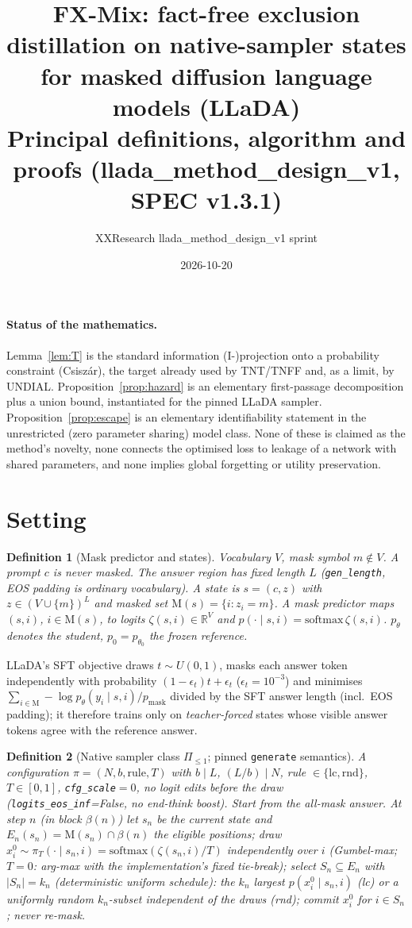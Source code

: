 \documentclass[11pt]{article}
\title{FX-Mix: fact-free exclusion distillation on native-sampler states\\for masked diffusion language models (LLaDA)\\[4pt]\large Principal definitions, algorithm and proofs (llada\_method\_design\_v1, SPEC v1.3.1)}
\author{XXResearch llada\_method\_design\_v1 sprint}
\date{2026-10-20}
\newtheorem{definition}{Definition}
\newcommand{\M}{\mathrm{M}}
\begin{document}
\maketitle

\paragraph{Status of the mathematics.} Lemma~\ref{lem:T} is the standard information (I-)projection onto a
probability constraint (Csisz\'ar), the target already used by TNT/TNFF and, as a limit, by UNDIAL. Proposition~\ref{prop:hazard}
is an elementary first-passage decomposition plus a union bound, instantiated for the pinned LLaDA sampler.
Proposition~\ref{prop:escape} is an elementary identifiability statement in the unrestricted (zero parameter sharing)
model class. None of these is claimed as the method's novelty, none connects the optimised loss to leakage of a
network with shared parameters, and none implies global forgetting or utility preservation.

\section{Setting}
\begin{definition}[Mask predictor and states]
Vocabulary $V$, mask symbol $m\notin V$. A prompt $c$ is never masked. The answer region has fixed length $L$
(\texttt{gen\_length}, EOS padding is ordinary vocabulary). A \emph{state} is $s=(c,z)$ with $z\in(V\cup\{m\})^L$ and
masked set $\M(s)=\{i: z_i=m\}$. A mask predictor maps $(s,i)$, $i\in\M(s)$, to logits $\zeta(s,i)\in\mathbb{R}^{V}$ and
$p(\cdot\mid s,i)=\mathrm{softmax}\,\zeta(s,i)$. $p_\theta$ denotes the student, $p_0=p_{\theta_0}$ the frozen reference.
\end{definition}
LLaDA's SFT objective draws $t\sim U(0,1)$, masks each answer token independently with probability $(1-\epsilon_t)t+\epsilon_t$
($\epsilon_t=10^{-3}$) and minimises $\sum_{i\in\M}\!-\log p_\theta(y_i\mid s,i)/p_{\text{mask}}$ divided by the SFT answer length (incl.\ EOS padding); it
therefore trains only on \emph{teacher-forced} states whose visible answer tokens agree with the reference answer.

\begin{definition}[Native sampler class $\Pi_{\le 1}$; pinned \texttt{generate} semantics]\label{def:sampler}
A configuration $\pi=(N,b,\text{rule},T)$ with $b\mid L$, $(L/b)\mid N$, rule $\in\{\mathrm{lc},\mathrm{rnd}\}$,
$T\in[0,1]$, \texttt{cfg\_scale}$=0$, no logit edits before the draw (\texttt{logits\_eos\_inf}=False, no end-think boost).
Start from the all-mask answer. At step $n$ (in block $\beta(n)$) let $s_n$ be the current state and
$E_n(s_n)=\M(s_n)\cap\beta(n)$ the eligible positions; draw $x^0_i\sim\pi_T(\cdot\mid s_n,i)=\mathrm{softmax}(\zeta(s_n,i)/T)$
independently over $i$ (Gumbel-max; $T=0$: arg-max with the implementation's fixed tie-break); select $S_n\subseteq E_n$
with $|S_n|=k_n$ (deterministic uniform schedule): the $k_n$ largest $p(x^0_i\mid s_n,i)$ (lc) or a uniformly random
$k_n$-subset independent of the draws (rnd); commit $x^0_i$ for $i\in S_n$; never re-mask.
\end{definition}
\end{document}
